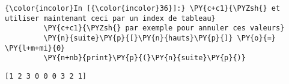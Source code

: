     \begin{Verbatim}[commandchars=\\\{\}]
{\color{incolor}In [{\color{incolor}36}]:} \PY{c+c1}{\PYZsh{} et utiliser maintenant ceci par un index de tableau}
         \PY{c+c1}{\PYZsh{} par exemple pour annuler ces valeurs}
         \PY{n}{suite}\PY{p}{[}\PY{n}{hauts}\PY{p}{]} \PY{o}{=} \PY{l+m+mi}{0}
         \PY{n+nb}{print}\PY{p}{(}\PY{n}{suite}\PY{p}{)}
\end{Verbatim}


    \begin{Verbatim}[commandchars=\\\{\}]
[1 2 3 0 0 0 3 2 1]

    \end{Verbatim}


    
    
    
